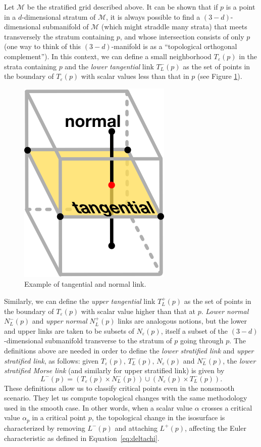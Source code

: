 Let $\mathcal{M}$ be the stratified grid described above.  It can be
shown that if $p$ is a point in a $d$-dimensional stratum of
$\mathcal{M}$, it is always possible to find a $(3-d)$-dimensional
submanifold of $\mathcal{M}$ (which might straddle many strata) that
meets transversely the stratum containing $p$, and whose intersection
consists of only $p$ (one way to think of this $(3-d)$-manifold is as a ``topological orthogonal
complement'').  In this context, we can define a small neighborhood
$T_\varepsilon(p)$ in the strata containing $p$ and the \emph{lower
  tangential} link $T_L^-(p)$ as the set of points in the boundary of
$T_\varepsilon(p)$ with scalar values less than that in $p$ (see Figure \ref{fig:chap4:smt}).
\begin{figure}[b]
\centering
\includegraphics[width=0.15\linewidth]{chapter3/figures/ilustration.png}
\caption{\label{fig:chap4:smt} Example of tangential and normal link.}
\end{figure}
Similarly, we can define the \emph{upper tangential} link $T_L^+(p)$ as
the set of points in the boundary of $T_\varepsilon(p)$ with scalar
value higher than that at $p$.  \emph{Lower normal} $N_L^-(p)$ and
\emph{upper normal} $N_L^+(p)$ links are analogous notions, but the
lower and upper links are taken to be subsets of $N_\varepsilon(p)$,
itself a subset of the $(3-d)$-dimensional submanifold transverse to
the stratum of $p$ going through $p$.  The definitions above are needed
in order to define the \emph{lower stratified link} and \emph{upper
  stratified link}, as follows: given $T_\varepsilon(p),\,
T_L^-(p),\,N_\varepsilon(p)$ and $N_L^-(p)$, the \emph{lower
  stratified Morse link} (and similarly for upper stratified link) is
given by
\begin{equation}
L^-(p) = (T_\varepsilon(p) \times N_L^-(p)) \cup (N_\varepsilon(p)
\times T_L^-(p)) \label{eq:lowerstratifiedlink}.
\end{equation}
These definitions allow us to classify critical points even in the nonsmooth scenario.
They let us compute topological changes with
the same methodology used in the smooth case. In other words, when a
scalar value $\alpha$ crosses a critical value $\alpha_p$ in a
critical point $p$, the topological change in the isosurface is
characterized by removing $L^-(p)$ and attaching $L^+(p)$, affecting
the Euler characteristic as defined in Equation~\eqref{eq:deltachi}.%

